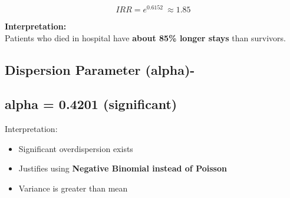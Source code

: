 \documentclass[
]{article}
\begin{document}
\[IRR = e^{0.6152}\  \approx 1.85\]

\textbf{Interpretation:\\
}Patients who died in hospital have \textbf{about 85\% longer stays}
than survivors.

\subsection{\texorpdfstring{\textbf{Dispersion Parameter
(alpha)-}}{Dispersion Parameter (alpha)-}}\label{dispersion-parameter-alpha-}

\subsection{alpha = 0.4201
(significant)}\label{alpha-0.4201-significant}

Interpretation:

\begin{itemize}
\item
  Significant overdispersion exists
\item
  Justifies using \textbf{Negative Binomial instead of Poisson}
\item
  Variance is greater than mean
\end{itemize}
\end{document}
